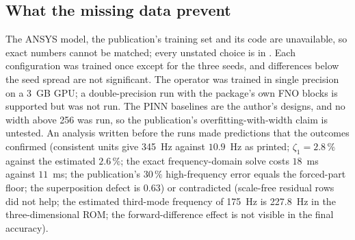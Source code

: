 \subsection*{What the missing data prevent}

The ANSYS model, the publication's training set and its code are unavailable, so exact numbers cannot be matched; every unstated choice is in . Each configuration was trained once except for the three seeds, and differences below the seed spread are not significant. The operator was trained in single precision on a 3~GB GPU; a double-precision run with the package's own FNO blocks is supported but was not run. The PINN baselines are the author's designs, and no width above 256 was run, so the publication's overfitting-with-width claim is untested. An analysis written before the runs made predictions that the outcomes confirmed (consistent units give 345~Hz against $10.9$~Hz as printed; $\zeta_1=2.8\,\%$ against the estimated $2.6\,\%$; the exact frequency-domain solve costs $18$~ms against $11$~ms; the publication's $30\,\%$ high-frequency error equals the forced-part floor; the superposition defect is $0.63$) or contradicted (scale-free residual rows did not help; the estimated third-mode frequency of 175~Hz is 227.8~Hz in the three-dimensional ROM; the forward-difference effect is not visible in the final accuracy).
